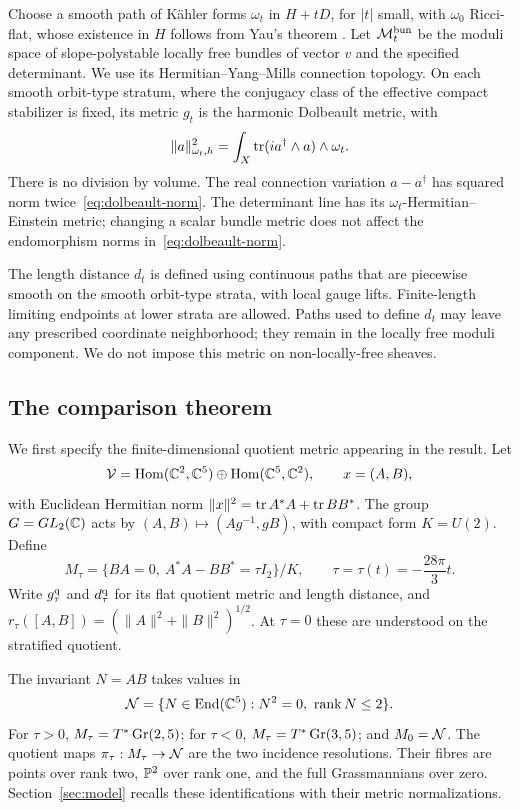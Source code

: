 Choose a smooth path of K\"ahler forms $\omega_t$ in $H+tD$, for $|t|$
small, with $\omega_0$ Ricci-flat, whose existence in $H$ follows from
Yau's theorem \cite{Yau78}. Let
$\mathcal M_t^{\rm bun}$ be the moduli space of slope-polystable locally free
bundles of vector $v$ and the specified determinant. We use its
Hermitian--Yang--Mills connection topology. On each smooth orbit-type
stratum, where the conjugacy class of the effective compact stabilizer
is fixed, its metric $g_t$ is the harmonic Dolbeault metric, with
\begin{equation}\label{eq:dolbeault-norm}
\|a\|_{\omega_t,h}^2
=\int_X\operatorname{tr}(i a^\dagger\wedge a)\wedge\omega_t .
\end{equation}
There is no division by volume. The real connection variation $a-a^\dagger$
has squared norm twice~\eqref{eq:dolbeault-norm}. The determinant line has
its $\omega_t$-Hermitian--Einstein metric; changing a scalar bundle metric
does not affect the endomorphism norms in~\eqref{eq:dolbeault-norm}.

The length distance $d_t$ is defined using continuous paths that are
piecewise smooth on the smooth orbit-type strata, with local gauge
lifts. Finite-length limiting endpoints at lower strata are allowed.
Paths used to define $d_t$ may leave any prescribed coordinate
neighborhood; they remain in the locally free moduli component. We do
not impose this metric on non-locally-free sheaves.

\subsection{The comparison theorem}

We first specify the finite-dimensional quotient metric appearing in the result. Let
\[
\mathcal V=\operatorname{Hom}(\mathbb C^2,\mathbb C^5)\oplus\operatorname{Hom}(\mathbb C^5,\mathbb C^2),\qquad x=(A,B),
\]
with Euclidean Hermitian norm $\|x\|^2=\operatorname{tr} A^*A+\operatorname{tr} BB^*$.
The group $G=GL_2(\mathbb C)$ acts by
$(A,B)\mapsto(Ag^{-1},gB)$, with compact form $K=U(2)$. Define
\begin{equation}\label{eq:model-intro}
M_\tau=\{BA=0,\ A^*A-BB^*=\tau I_2\}/K,\qquad
\tau=\tau(t)=-\frac{28\pi}{3}t .
\end{equation}
Write $g_\tau^{\rm q}$ and $d_\tau^{\rm q}$ for its flat quotient metric
and length distance, and $r_\tau([A,B])=(\|A\|^2+\|B\|^2)^{1/2}$.
At $\tau=0$ these are understood on the stratified quotient.

The invariant $N=AB$ takes values in
\begin{equation}\label{eq:nilpotent-cone}
\mathcal N=\{N\in\operatorname{End}(\mathbb C^5):N^2=0,\ \operatorname{rank} N\le2\}.
\end{equation}
For $\tau>0$, $M_\tau=T^*\operatorname{Gr}(2,5)$; for $\tau<0$,
$M_\tau=T^*\operatorname{Gr}(3,5)$; and $M_0=\mathcal N$. The quotient maps
$\pi_\tau:M_\tau\to\mathcal N$ are the two incidence resolutions. Their fibres
are points over rank two, $\mathbb P^2$ over rank one, and the full
Grassmannians over zero. Section~\ref{sec:model} recalls these
identifications with their metric normalizations.

